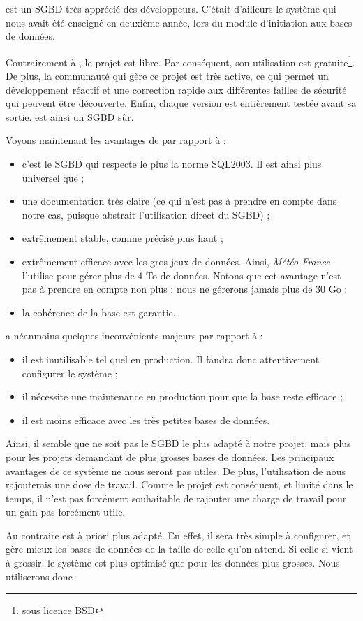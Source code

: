 \psql est un SGBD très apprécié des développeurs. C'était d'ailleurs le système qui nous avait été enseigné en deuxième année, lors du module d'initiation aux bases de données. 

Contrairement à \mysql, le projet est libre. Par conséquent, son utilisation est gratuite\footnote{sous licence BSD}. De plus, la communauté qui gère ce projet est très active, ce qui permet un développement réactif et une correction rapide aux différentes failles de sécurité qui peuvent être découverte. 
Enfin, chaque version est entièrement testée avant sa sortie. \psql est ainsi un SGBD sûr. 

Voyons maintenant les avantages de \psql par rapport à \mdb : 

\begin{itemize}
\item c'est le SGBD qui respecte le plus la norme SQL2003. Il est ainsi plus universel que \mdb ;
\item une documentation très claire (ce qui n'est pas à prendre en compte dans notre cas, puisque \symfony abstrait l'utilisation direct du SGBD) ;
\item extrêmement stable, comme précisé plus haut ;
\item extrêmement efficace avec les gros jeux de données. Ainsi, \textit{Météo France} l'utilise pour gérer plus de 4 To de données. Notons que cet avantage n'est pas à prendre en compte non plus : nous ne gérerons jamais plus de 30 Go ;
\item la cohérence de la base est garantie.
\end{itemize}

\psql a néanmoins quelques inconvénients majeurs  par rapport à \mdb : 

\begin{itemize}
\item il est inutilisable tel quel en production. Il faudra donc attentivement configurer le système ;
\item il nécessite une maintenance en production pour que la base reste efficace ;
\item il est moins efficace avec les très petites bases de données.  
\end{itemize}

\bigbreak
Ainsi, il semble que \psql ne soit pas le SGBD le plus adapté à notre projet, mais plus pour les projets demandant de plus grosses bases de données. 
Les principaux avantages de ce système ne nous seront pas utiles. De plus, l'utilisation de \psql nous rajouterais une dose de travail. Comme le projet est conséquent, et limité dans le temps, il n'est pas forcément souhaitable de rajouter une charge de travail pour un gain pas forcément utile. 

Au contraire \mdb est à priori plus adapté. En effet, il sera très simple à configurer, et gère mieux les bases de données de la taille de celle qu'on attend. Si celle si vient à grossir, le système est plus optimisé que \mysql pour les données plus grosses. Nous utiliserons donc \mdb. 
